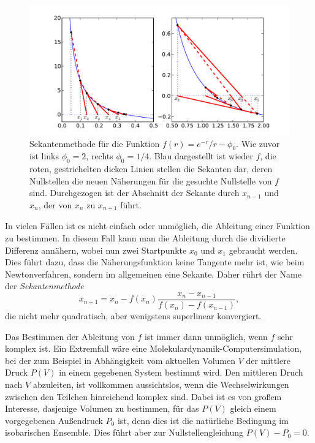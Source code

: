 \begin{figure}
  \centering
  \includegraphics[width=\textwidth]{plots/sekanten}
  \caption{Sekantenmethode für die Funktion $f(r) = e^{-r}/r -
    \phi_0$. Wie zuvor ist links $\phi_0=2$, rechts $\phi_0=1/4$.
    Blau dargestellt ist wieder $f$, die roten, gestrichelten dicken
    Linien stellen die Sekanten dar, deren Nullstellen die neuen
    Näherungen für die gesuchte Nullstelle von $f$ sind. Durchgezogen
    ist der Abschnitt der Sekante durch $x_{n-1}$ und $x_n$, der von $x_n$
    zu $x_{n+1}$ führt.}
  \label{fig:sekanten}
\end{figure}

In vielen Fällen ist es nicht einfach oder unmöglich, die Ableitung
einer Funktion zu bestimmen. In diesem Fall kann man die Ableitung
durch die dividierte Differenz annähern, wobei nun zwei Startpunkte
$x_0$ und $x_1$ gebraucht werden. Dies führt dazu, dass die
Näherungsfunktion keine Tangente mehr ist, wie beim Newtonverfahren,
sondern im allgemeinen eine Sekante. Daher rührt der Name der
\emph{Sekantenmethode}
\begin{equation}
  x_{n+1} = x_n - f(x_n)\frac{x_n - x_{n-1}}{f(x_n) - f(x_{n-1})},
\end{equation}
die nicht mehr quadratisch, aber wenigstens superlinear konvergiert.

Das Bestimmen der Ableitung von $f$ ist immer dann unmöglich, wenn $f$
sehr komplex ist. Ein Extremfall wäre eine
Molekulardynamik-Computersimulation, bei der zum Beispiel in
Abhängigkeit vom aktuellen Volumen $V$ der mittlere Druck $P(V)$ in
einem gegebenen System bestimmt wird. Den mittleren Druch nach $V$
abzuleiten, ist vollkommen aussichtslos, wenn die Wechselwirkungen
zwischen den Teilchen hinreichend komplex sind. Dabei ist es von
großem Interesse, dasjenige Volumen zu bestimmen, für das $P(V)$
gleich einem vorgegebenen Außendruck $P_0$ ist, denn dies ist die
natürliche Bedingung im isobarischen Ensemble. Dies führt aber zur
Nullstellengleichung $P(V)-P_0 = 0$.

